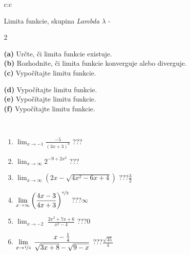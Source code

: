 \documentclass[10pt]{report}
\begin{document}
\newpage
\thispagestyle{empty}
\begin{tabular}{c:c}
\begin{minipage}[c][104.5mm][t]{0.5\linewidth}
\begin{center}
\vspace{7mm}
{\huge Limita funkcie, skupina \textit{Lambda $\lambda$} -}\\[5mm]
\begin{minipage}{0.95\linewidth}
\begin{center}
{\small \begin{multicols}{2} \raggedright
\textbf{(a)} Určte, či limita funkcie existuje. \\[1mm]
\textbf{(b)} Rozhodnite, či limita funkcie konverguje alebo diverguje. \\[1mm]
\textbf{(c)} Vypočítajte limitu funkcie. \par \columnbreak
\textbf{(d)} Vypočítajte limitu funkcie. \\[1mm]
\textbf{(e)} Vypočítajte limitu funkcie. \\[1mm]
\textbf{(f)} Vypočítajte limitu funkcie. \\[1mm]
\end{multicols}
}
\end{center}
\end{minipage}
\\[4mm]
\begin{minipage}{0.79\linewidth}
\begin{center}
\begin{varwidth}{\linewidth}
\begin{enumerate}
\normalsize
\item $\displaystyle\lim_{x\to-1}{\frac{-5}{(3x+3)^{8}}}$\quad \dotfill\; ???\;\dotfill \quad {}
\item $\displaystyle\lim_{x\to\infty}{2^{-9+2x^2}}$\quad \dotfill\; ???\;\dotfill \quad {}
\item $\displaystyle\lim_{x\to\infty}{\left(2x - \sqrt{4x^2-6x+4}\right)}$\quad \dotfill\; ???\;\dotfill \quad $\frac{3}{2}$
\item $\displaystyle\lim_{x\to\infty}{\left( \frac{4x-3}{4x+3} \right)^{\nicefrac{x}{2}}}$\quad \dotfill\; ???\;\dotfill \quad $\infty$
\item $\displaystyle\lim_{x\to -2}{\;\frac{2x^2+7x+6}{x^2-4}}$\quad \dotfill\; ???\;\dotfill \quad $0$
\item $\displaystyle\lim_{x\to \nicefrac{1}{4}}{\;\frac{x-\frac{1}{4}}{\sqrt{3x+8} - \sqrt{9-x}}}$\quad \dotfill\; ???\;\dotfill \quad $\frac{\sqrt{35}}{4}$

\end{enumerate}
\end{varwidth}
\end{center}
\end{minipage}
\end{center}
\end{minipage}
\end{tabular}
\end{document}
